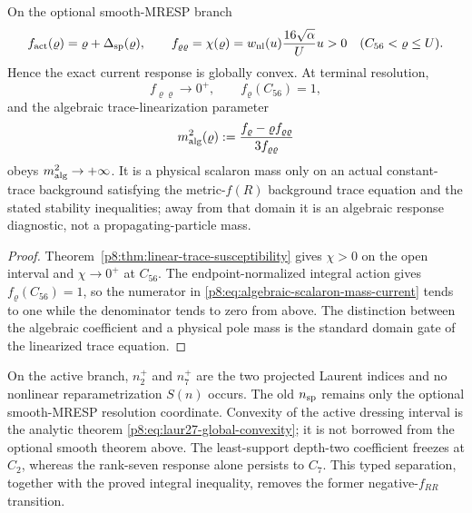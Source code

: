 \documentclass[12pt,a4paper]{article}
\begin{document}
\begin{theorem}
\label{p8:thm:global-convexity-terminal-freeze}
On the optional smooth-MRESP branch
\[
 f_{\rm act}(\varrho)=\varrho+\Delta_{\rm sp}(\varrho),\qquad
 f_{\varrho\varrho}=\chi(\varrho)
 =w_{\rm nl}(u)\frac{16\sqrt\alpha}{U}u>0
 \quad(C_{56}<\varrho\le U).
\]
Hence the exact current response is globally convex.  At terminal resolution,
\[
 f_{\varrho\varrho}\to0^+,\qquad f_{\varrho}(C_{56})=1,
\]
and the algebraic trace-linearization parameter
\begin{equation}
\label{p8:eq:algebraic-scalaron-mass-current}
 m_{\rm alg}^2(\varrho)
 :=\frac{f_{\varrho}-\varrho f_{\varrho\varrho}}
 {3f_{\varrho\varrho}}
\end{equation}
obeys \(m_{\rm alg}^2\to+\infty\).  It is a physical scalaron mass only on
an actual constant-trace background satisfying the metric-\(f(R)\) background
trace equation and the stated stability inequalities; away from that domain it
is an algebraic response diagnostic, not a propagating-particle mass.
\end{theorem}

\begin{proof}
Theorem~\ref{p8:thm:linear-trace-susceptibility} gives \(\chi>0\) on the
open interval and \(\chi\to0^+\) at \(C_{56}\).  The endpoint-normalized
integral action gives \(f_{\varrho}(C_{56})=1\), so the numerator in
\eqref{p8:eq:algebraic-scalaron-mass-current} tends to one while the denominator
tends to zero from above.  The distinction between the algebraic coefficient
and a physical pole mass is the standard domain gate of the linearized trace
equation.
\end{proof}

\begin{remark}
On the active branch, \(n_2^+\) and \(n_7^+\) are the two projected Laurent
indices and no nonlinear reparametrization \(S(n)\) occurs.  The old
\(n_{\rm sp}\) remains only the optional smooth-MRESP resolution coordinate.
Convexity of the active dressing interval is the analytic theorem
\eqref{p8:eq:laur27-global-convexity}; it is not borrowed from the optional
smooth theorem above.  The least-support depth-two coefficient freezes at
\(C_2\), whereas the rank-seven response alone persists to \(C_7\).  This
typed separation, together with the proved integral inequality, removes the
former negative-\(f_{RR}\) transition.
\end{remark}
\end{document}
